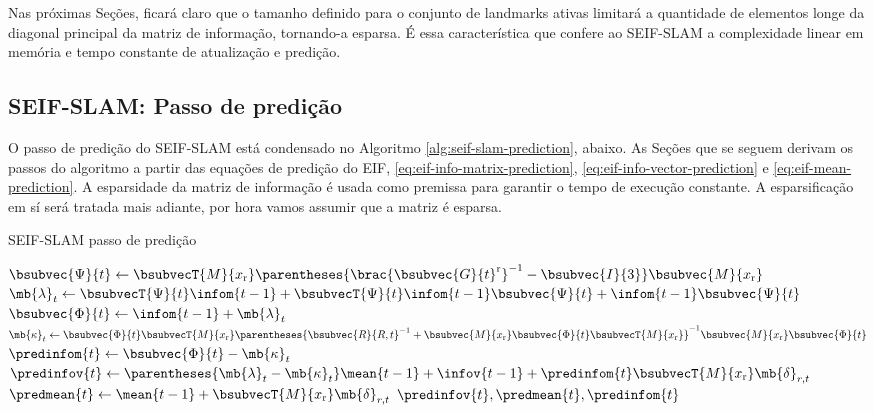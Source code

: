 Nas próximas Seções, ficará claro que o tamanho definido para o conjunto de 
landmarks ativas limitará a quantidade de elementos longe da diagonal 
principal da matriz de informação, tornando-a esparsa. É essa 
característica que confere ao SEIF-SLAM a complexidade linear em memória e 
tempo constante de atualização e predição.

\subsection{SEIF-SLAM: Passo de predição}
\label{sec:seif-prediction}
\newcommand{\psitvalue}{\bsubvecT{M}{x_\mathrm{r}} \parentheses{\brac{\bsubvec{G}{t}^{\mathrm{r}}}^{-1} - \bsubvec{I}{3}} \bsubvec{M}{x_\mathrm{r}}}
\newcommand{\kappatvalue}{\bsubvec{\Phi}{t}\bsubvecT{M}{x_\mathrm{r}}
    \parentheses{\bsubvec{R}{R,t}^{-1} + \bsubvec{M}{x_\mathrm{r}}\bsubvec{\Phi}{t}
      \bsubvecT{M}{x_\mathrm{r}}}^{-1} \bsubvec{M}{x_\mathrm{r}}\bsubvec{\Phi}{t}
}
\newcommand{\lambdatvalue}{\bsubvecT{\Psi}{t}\infom{t-1} + \bsubvecT{\Psi}{t}\infom{t-1}\bsubvec{\Psi}{t} + \infom{t-1}\bsubvec{\Psi}{t}}
\newcommand{\predXiTValue}{\parentheses{\mb{\lambda}_t - \mb{\kappa}_t}\mean{t-1} + \infov{t-1} + \predinfom{t}\bsubvecT{M}{x_\mathrm{r}} \mb{\delta}_{r,t}}
\newcommand{\predmeanTValue}{\mean{t-1} + \bsubvecT{M}{x_\mathrm{r}} \mb{\delta}_{r,t}}
O passo de predição do SEIF-SLAM está condensado no Algoritmo \ref{alg:seif-slam-prediction}, abaixo. As Seções que se seguem derivam os 
passos do algoritmo a partir das equações de predição do EIF, \ref{eq:eif-info-matrix-prediction}, \ref{eq:eif-info-vector-prediction} e \ref{eq:eif-mean-prediction}. A esparsidade da matriz de informação é 
usada como premissa para garantir o tempo de execução constante. 
A esparsificação em sí será tratada mais adiante, por hora vamos assumir que a matriz é esparsa.

\begin{algorithm}[h]
  \caption{SEIF-SLAM passo de predição}
  \label{alg:seif-slam-prediction}
  \begin{algorithmic}[1]
    \State $\bsubvec{\Psi}{t} \gets \psitvalue $
    \State $\mb{\lambda}_t \gets \lambdatvalue$
    \State $\bsubvec{\Phi}{t} \gets \infom{t-1} + \mb{\lambda}_t$
    \State $\mb{\kappa}_t \gets \kappatvalue$
    \State $\predinfom{t} \gets \bsubvec{\Phi}{t} - \mb{\kappa}_t$
    \State $\predinfov{t} \gets \predXiTValue$
    \State $\predmean{t} \gets \predmeanTValue$
    \State \Return $\predinfov{t}, \predmean{t}, \predinfom{t}$
    \EndProcedure
  \end{algorithmic}
\end{algorithm}

